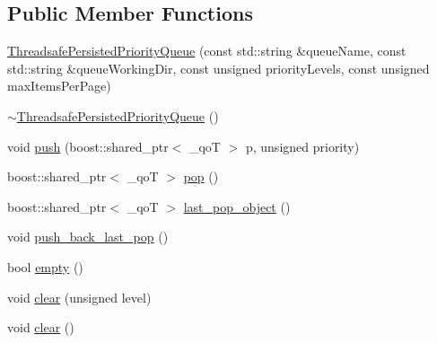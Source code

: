 \subsection*{Public Member Functions}
\begin{DoxyCompactItemize}
\item 
\hyperlink{a00044_ad93da6323ca757793d77379d9dbf28a7}{Threadsafe\-Persisted\-Priority\-Queue} (const std\-::string \&queue\-Name, const std\-::string \&queue\-Working\-Dir, const unsigned priority\-Levels, const unsigned max\-Items\-Per\-Page)
\item 
\hyperlink{a00044_a595ff6bfbc443d50b5f280711618fc9d}{$\sim$\-Threadsafe\-Persisted\-Priority\-Queue} ()
\item 
void \hyperlink{a00044_a593f66f576c7d4502e44529efbfad7d0}{push} (boost\-::shared\-\_\-ptr$<$ \-\_\-qo\-T $>$ p, unsigned priority)
\item 
boost\-::shared\-\_\-ptr$<$ \-\_\-qo\-T $>$ \hyperlink{a00044_a34be1a3216d514fdf5263a3b65eb3d87}{pop} ()
\item 
boost\-::shared\-\_\-ptr$<$ \-\_\-qo\-T $>$ \hyperlink{a00044_aa0bd8c361a95ae5ed3e15621178a2d65}{last\-\_\-pop\-\_\-object} ()
\item 
void \hyperlink{a00044_a43706bc9b32eb6b4f8a89242818d7e51}{push\-\_\-back\-\_\-last\-\_\-pop} ()
\item 
bool \hyperlink{a00044_ab45f3294d86458e714364dec22a9980c}{empty} ()
\item 
void \hyperlink{a00044_aafe0d24defdf58523c7e6532055569e5}{clear} (unsigned level)
\item 
void \hyperlink{a00044_a17e86ea47a27497f4396f84e9ad1b314}{clear} ()
\end{DoxyCompactItemize}


